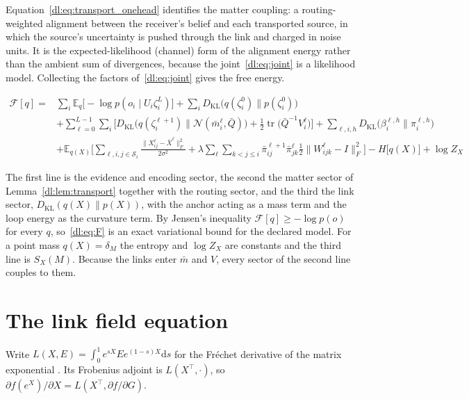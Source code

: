 \documentclass[11pt]{article}
\theoremstyle{definition}
\theoremstyle{remark}
\providecommand{\tr}{\operatorname{tr}}
\providecommand{\KL}{D_{\mathrm{KL}}}
\newcommand{\E}{\mathbb E}
\newcommand{\N}{\mathcal N}
\newcommand{\Qb}{\bar Q}
\begin{document}
Equation~\eqref{dl:eq:transport_onehead} identifies the matter coupling: a routing-weighted alignment between the receiver's belief and each transported source, in which the source's uncertainty is pushed through the link and charged in noise units. It is the expected-likelihood (channel) form of the alignment energy rather than the ambient sum of divergences, because the joint~\eqref{dl:eq:joint} is a likelihood model. Collecting the factors of~\eqref{dl:eq:joint} gives the free energy.

\begin{equation}
\boxed{
\begin{aligned}
\mathcal F[q]={}&\sum_i\E_q\big[-\log p(o_i\mid U_i\zeta_i^L)\big]+\sum_i\KL\big(q(\zeta_i^0)\|p(\zeta_i^0)\big)\\
&+\sum_{\ell=0}^{L-1}\sum_i\Big[\KL\big(q(\zeta_i^{\ell+1})\|\N(\bar m_i^\ell,\Qb)\big)+\tfrac12\tr\big(\Qb^{-1}V_i^\ell\big)\Big]
+\sum_{\ell,i,h}\KL\big(\beta_i^{\ell,h}\|\pi_i^{\ell,h}\big)\\
&+\E_{q(X)}\Big[\sum_{\ell,i,j\in\mathcal S_i}\frac{\|X_{ij}^\ell-\bar X^\ell\|_F^2}{2\sigma^2}
+\lambda\sum_{\ell}\sum_{k<j\le i}\bar\pi_{ij}^{\ell+1}\bar\pi_{jk}^\ell\tfrac12\big\|W_{ijk}^\ell-I\big\|_F^2\Big]-H\big[q(X)\big]+\log Z_X
\end{aligned}}
\label{dl:eq:F}
\end{equation}

The first line is the evidence and encoding sector, the second the matter sector of Lemma~\ref{dl:lem:transport} together with the routing sector, and the third the link sector, $\KL(q(X)\|p(X))$, with the anchor acting as a mass term and the loop energy as the curvature term. By Jensen's inequality $\mathcal F[q]\ge-\log p(o)$ for every $q$, so~\eqref{dl:eq:F} is an exact variational bound for the declared model. For a point mass $q(X)=\delta_M$ the entropy and $\log Z_X$ are constants and the third line is $S_X(M)$. Because the links enter $\bar m$ and $V$, every sector of the second line couples to them.

\section{The link field equation}
\label{dl:sec:field}

Write $L(X,E)=\int_0^1e^{sX}Ee^{(1-s)X}\mathrm{d}s$ for the Fr\'echet derivative of the matrix exponential \cite{dl:higham2008}. Its Frobenius adjoint is $L(X^\top,\cdot)$, so $\partial f(e^X)/\partial X=L(X^\top,\partial f/\partial G)$.
\end{document}
